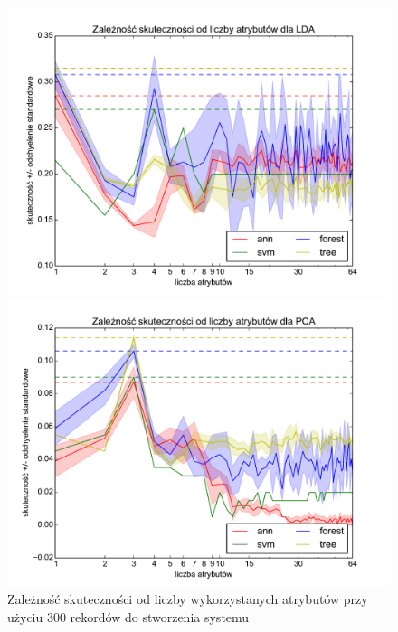 \begin{figure}
\centering
\begin{minipage}{.5\textwidth}

\centering
\includegraphics[scale=\fesize]{res/digits_300_all_LinearDiscriminantAnalysis.pdf}

  
\end{minipage}%
\begin{minipage}{.5\textwidth}

\centering
\includegraphics[scale=\fesize]{res/digits_300_all_PCA.pdf}
  
\end{minipage}
\caption[Caption for LOF]{Zależność skuteczności od liczby wykorzystanych atrybutów przy użyciu 300 rekordów do stworzenia systemu\label{fe_300}}
\end{figure}

